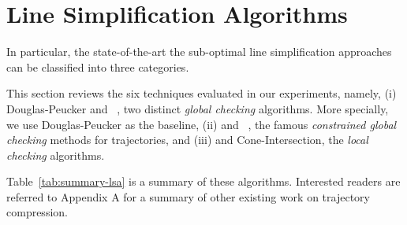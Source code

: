 \newtheorem{theorem}{Theorem}
\newtheorem{lemma}{Lemma}

\vspace{-1ex}
\section{Line Simplification Algorithms}
\label{sec-lsa}

In particular, the state-of-the-art the sub-optimal line simplification approaches can be classified into three categories.



This section reviews the six techniques evaluated in our experiments, namely,
(i) Douglas-Peucker\cite{Douglas:Peucker} and \pavlidis~\cite{Pavlidis:Segment}, two distinct \emph{global checking} algorithms.
More specially, we use Douglas-Peucker as the baseline,
(ii) \bqsa\cite{Liu:BQS} and \squishe~\cite{Muckell:SQUISH}, the famous \emph{constrained global checking} methods for trajectories, %
and (iii) \operb\cite{Lin:Operb} and Cone-Intersection\cite{Williams:Longest,Sklansky:Cone,Dunham:Cone, Zhao:Sleeve}, the \emph{local checking} algorithms.

Table~\ref{tab:summary-lsa} is a summary of these algorithms.
Interested readers are referred to Appendix A for a summary of other existing work on trajectory compression.


